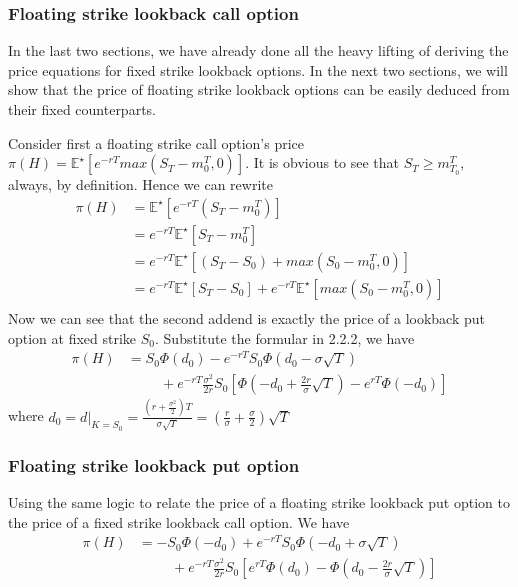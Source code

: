 \documentclass{article}
\begin{document}
\subsubsection{Floating strike lookback call option
}
In the last two sections, we have already done all the heavy lifting of deriving the price equations for fixed strike lookback options.
In the next two sections, we will show that the price of floating strike lookback options can be easily deduced from their fixed counterparts.

Consider first a floating strike call option's price $\pi(H) = \mathbb{E^{\star}}[e^{-rT} max(S_T - m_{0}^T, 0)]$.
It is obvious to see that $S_T \geq m_{T_0}^T$, always, by definition. Hence we can rewrite
\begin{align*}
\pi(H) 	&= \mathbb{E^{\star}}[e^{-rT} (S_T - m_{0}^T)] \\
		&= e^{-rT} \mathbb{E^{\star}}[S_T - m_{0}^T] \\
		&= e^{-rT} \mathbb{E^{\star}}[(S_T - S_0) + max(S_{0} - m_{0}^T, 0)] \\
		&= e^{-rT} \mathbb{E^{\star}}[S_T - S_0] + e^{-rT} \mathbb{E^{\star}}[max(S_{0} - m_{0}^T, 0)] \\
\end{align*}
Now we can see that the second addend is exactly the price of a lookback put option at fixed strike $S_0$.
Substitute the formular in 2.2.2, we have
\begin{align*}
\pi(H)	&= S_0 \Phi(d_0) - e^{-rT}S_0 \Phi(d_0 - \sigma \sqrt{T} ) \\
		&\hspace{1cm} + e^{-rT}\frac{\sigma^2}{2r}S_0 \left[
			\Phi\left(-d_0+ \frac{2r}{\sigma}\sqrt{T} \right) - e^{rT}\Phi(-d_0)
		\right]
\end{align*}
where $d_0 = d|_{K = S_0} = \frac{(r+\frac{\sigma^2}{2})T}{\sigma\sqrt{T}} = (\frac{r}{\sigma} + \frac{\sigma}{2})\sqrt{T}$
\subsubsection{Floating strike lookback put option
}
Using the same logic to relate the price of a floating strike lookback put option to the price of a fixed strike lookback call option.
We have
\begin{align*}
\pi(H) 	&= -S_0 \Phi(-d_0) + e^{-rT}S_0 \Phi(-d_0 + \sigma \sqrt{T} ) \\
		&\hspace{1cm} + e^{-rT}\frac{\sigma^2}{2r}S_0 \left[
			e^{rT}\Phi(d_0) - \Phi\left(d_0 - \frac{2r}{\sigma}\sqrt{T} \right)
		\right]
\end{align*}
\end{document}
